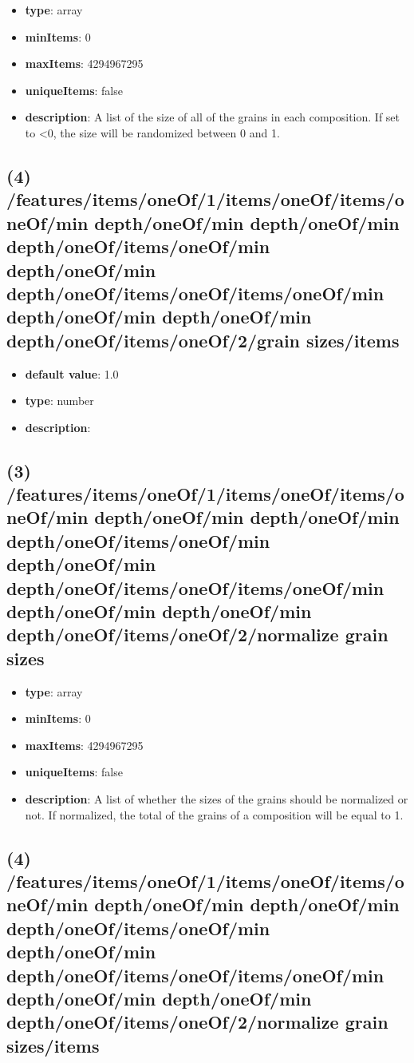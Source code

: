 \begin{itemize}[leftmargin=3em]\item {\bf type}: array
\item {\bf minItems}: 0
\item {\bf maxItems}: 4294967295
\item {\bf uniqueItems}: false
\item {\bf description}: A list of the size of all of the grains in each composition. If set to <0, the size will be randomized between 0 and 1.
\end{itemize}\subsection{(4) /features/items/oneOf/1/items/oneOf/items/oneOf/min depth/oneOf/min depth/oneOf/min depth/oneOf/items/oneOf/min depth/oneOf/min depth/oneOf/items/oneOf/items/oneOf/min depth/oneOf/min depth/oneOf/min depth/oneOf/items/oneOf/2/grain sizes/items}
\begin{itemize}[leftmargin=4em]\item {\bf default value}: 1.0
\item {\bf type}: number
\item {\bf description}: 
\end{itemize}\subsection{(3) /features/items/oneOf/1/items/oneOf/items/oneOf/min depth/oneOf/min depth/oneOf/min depth/oneOf/items/oneOf/min depth/oneOf/min depth/oneOf/items/oneOf/items/oneOf/min depth/oneOf/min depth/oneOf/min depth/oneOf/items/oneOf/2/normalize grain sizes}
\begin{itemize}[leftmargin=3em]\item {\bf type}: array
\item {\bf minItems}: 0
\item {\bf maxItems}: 4294967295
\item {\bf uniqueItems}: false
\item {\bf description}: A list of whether the sizes of the grains should be normalized or not. If normalized, the total of the grains of a composition will be equal to 1.
\end{itemize}\subsection{(4) /features/items/oneOf/1/items/oneOf/items/oneOf/min depth/oneOf/min depth/oneOf/min depth/oneOf/items/oneOf/min depth/oneOf/min depth/oneOf/items/oneOf/items/oneOf/min depth/oneOf/min depth/oneOf/min depth/oneOf/items/oneOf/2/normalize grain sizes/items}
